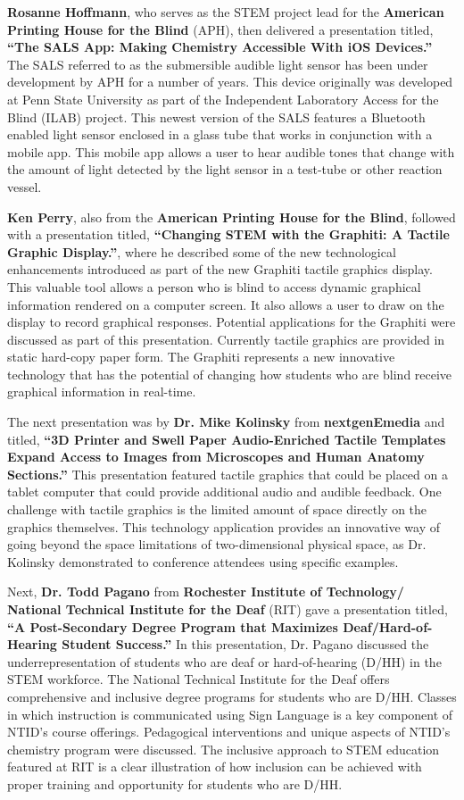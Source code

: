 \documentclass[11.5pt]{sig-alternate} %
\begin{document}
\begin{large}
\textbf{Rosanne Hoffmann}, who serves as the STEM project lead for the \textbf{American Printing House for the Blind} (APH), then delivered a presentation titled, \textbf{“The SALS App: Making Chemistry Accessible With iOS Devices.”} The SALS referred to as the submersible audible light sensor has been under development by APH for a number of years. This device originally was developed at Penn State University as part of the Independent Laboratory Access for the Blind (ILAB) project. This newest version of the SALS features a Bluetooth enabled light sensor enclosed in a glass tube that works in conjunction with a mobile app. This mobile app allows a user to hear audible tones that change with the amount of light detected by the light sensor in a test-tube or other reaction vessel.

\textbf{Ken Perry}, also from the \textbf{American Printing House for the Blind}, followed with a presentation titled, \textbf{“Changing STEM with the Graphiti: A Tactile Graphic Display.”}, where he described some of the new technological enhancements introduced as part of the new Graphiti tactile graphics display. This valuable tool allows a person who is blind to access dynamic graphical information rendered on a computer screen. It also allows a user to draw on the display to record graphical responses. Potential applications for the Graphiti were discussed as part of this presentation. Currently tactile graphics are provided in static hard-copy paper form. The Graphiti represents a new innovative technology that has the potential of changing how students who are blind receive graphical information in real-time.

The next presentation was by \textbf{Dr. Mike Kolinsky} from \textbf{nextgenEmedia} and titled, \textbf{“3D Printer and Swell Paper Audio-Enriched Tactile Templates Expand Access to Images from Microscopes and Human Anatomy Sections.”} This presentation featured tactile graphics that could be placed on a tablet computer that could provide additional audio and audible feedback. One challenge with tactile graphics is the limited amount of space directly on the graphics themselves. This technology application provides an innovative way of going beyond the space limitations of two-dimensional physical space, as Dr. Kolinsky demonstrated to conference attendees using specific examples.

Next, \textbf{Dr. Todd Pagano} from \textbf{Rochester Institute of Technology/ National Technical Institute for the Deaf} (RIT) gave a presentation titled, \textbf{“A Post-Secondary Degree Program that Maximizes Deaf/Hard-of-Hearing Student Success.”}  In this presentation, Dr. Pagano discussed the underrepresentation of students who are deaf or hard-of-hearing (D/HH) in the STEM workforce. The National Technical Institute for the Deaf offers comprehensive and inclusive degree  programs for students who are D/HH. Classes in which instruction is communicated using Sign Language is a key component of NTID’s course offerings. Pedagogical interventions and unique aspects of NTID’s chemistry program were discussed. The inclusive approach to STEM education featured at RIT is a clear illustration of how inclusion can be achieved with proper training and opportunity for students who are D/HH.


\end{large}
\end{document}
